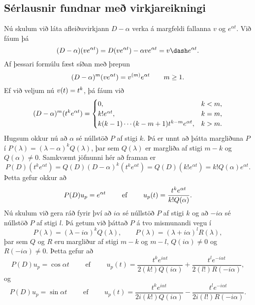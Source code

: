 \subsection*{Sérlausnir fundnar með virkjareikningi}

Nú skulum við láta afleiðuvirkjann $D-{\alpha}$ verka á margfeldi
fallanna $v$ og $e^{{\alpha} t}$.  Við fáum þá 
 \begin{equation*}(D-\alpha)(ve\sp{\alpha t})
=D(ve\sp{\alpha t})-\alpha ve\sp{\alpha t} = v\dash e\sp{\alpha t}.
\label{2.4.10}
 \end{equation*}
Af þessari formúlu fæst síðan með þrepun
 \begin{equation*}(D-\alpha)\sp m(ve\sp{\alpha t})= v\sp{(m)} e\sp{\alpha
t}\qquad m\geq 1.\label{2.4.11}
 \end{equation*}
Ef við veljum nú $v(t)=t\sp k$, þá fáum við 
 \begin{equation*}\label{2.4.12}(D-\alpha)\sp m(t\sp ke\sp{\alpha t})= 
\begin{cases}
0, &k<m,\\
k!e^{\alpha t},& k=m,\\
k(k-1)\cdots(k-m+1)t^{k-m}e^{\alpha t},& k>m.
\end{cases}
 \end{equation*}
Hugsum okkur nú að $\alpha$ sé núllstöð $P$ af stigi $k$.  Þá er
unnt að þátta margliðuna $P$ í
$P(\lambda)=(\lambda-\alpha)^kQ(\lambda)$, þar sem $Q(\lambda)$ er
margliða af stigi $m-k$ og $Q(\alpha)\neq 0$.  Samkvæmt jöfnunni hér
að framan  er
$$
P(D)(t^ke^{\alpha t}) = Q(D)(D-\alpha)^k(t^ke^{\alpha t})=
Q(D)(k!e^{\alpha t})=k!Q(\alpha)e^{\alpha t}.
$$
Þetta gefur okkur að
\begin{equation*}
P(D)u_p=e\sp{\alpha t} \qquad \text{ ef } \qquad
u_p(t) = \dfrac{t^ke^{\alpha t}}{k!Q(\alpha)}.
\label{2.4.13}
\end{equation*}
Nú skulum við gera ráð fyrir því að
$i\alpha$ sé núllstöð $P$ af stigi $k$ og að $-i\alpha$ sé núllstöð
$P$ af stigi $l$.  Þá getum við þáttað $P$ á tvo mismunandi vegu í
$$
P(\lambda)= (\lambda-i\alpha)^kQ(\lambda), \qquad
P(\lambda)= (\lambda+i\alpha)^lR(\lambda),
$$
þar sem $Q$ og $R$ eru margliður af stigi $m-k$ og $m-l$, 
$Q(i\alpha)\neq 0$ og $R(-i\alpha)\neq 0$.   Þetta gefur að
 \begin{equation*}
P(D)u_p=\cos \alpha t \qquad\text{ ef } \qquad
u_p(t)=\dfrac{t^ke^{i\alpha t}}{2(k!)Q(i\alpha)}+
\dfrac{t^le^{-i\alpha t}}{2(l!)R(-i\alpha)},
\label{2.4.14}
 \end{equation*}
og
 \begin{equation*}
P(D)u_p=\sin \alpha t \qquad \text{ ef } \qquad
u_p(t)=\dfrac{t^ke^{i\alpha t}}{2i(k!)Q(i\alpha)}-
\dfrac{t^le^{-i\alpha t}}{2i(l!)R(-i\alpha)}.
\label{2.4.15}
 \end{equation*}


